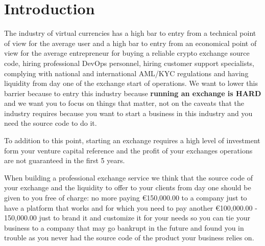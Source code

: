 \documentclass[11pt,fleqn]{book} %
\begin{document}





\chapter{Introduction}
The industry of virtual currencies has a high bar to entry from a technical point of view for the average user
and a high bar to entry from an economical point of view for the average entrepreneur for buying a reliable crypto 
exchange source code, hiring professional DevOps personnel, hiring customer support specialists, complying with national and 
international AML/KYC regulations and having liquidity from day one of the exchange start of operations. 
We want to lower this barrier because to entry this industry because \textbf{running an exchange is HARD} 
and we want you to focus on things that matter, not on the caveats that the industry requires because
you want to start a business in this industry and you need the source code to do it.

To addition to this point, starting an exchange requires a high level of investment form your venture capital reference
and the profit of your exchanges operations are not guaranteed in the first 5 years.

When building a professional exchange service we think that the source code of your exchange and the liquidity to offer to your clients
from day one should be given to you free of charge: no more paying \euro150,000.00 to a company just to have a platform that works and for
which you need to pay another \euro100,000.00 - 150,000.00 just to brand it and customize it for your needs so you can tie your 
business to a company that may go bankrupt in the future and found you in trouble as you never had the source code of the product
your business relies on.
\end{document}
